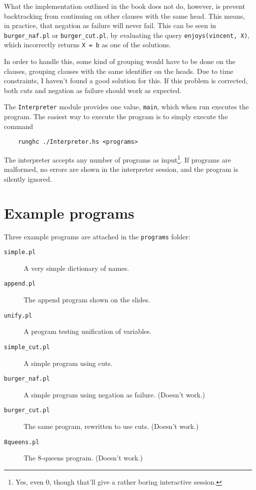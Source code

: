 \documentclass[11pt,a4paper]{article}
\begin{document}
What the implementation outlined in the book does not do, however, is prevent
backtracking from continuing on other clauses with the same head. This means,
in practice, that negation as failure will never fail. This can be seen in
\texttt{burger\_naf.pl} or \texttt{burger\_cut.pl}, by evaluating the query
\texttt{enjoys(vincent, X)}, which incorrectly returns \texttt{X = b} as one
of the solutions.

In order to handle this, some kind of grouping would have to be done on the
clauses, grouping clauses with the same identifier on the heads. Due to time
constraints, I haven't found a good solution for this. If this problem is
corrected, both cuts and negation as failure should work as expected.

The \texttt{Interpreter} module provides one value, \texttt{main}, which when
run executes the program. The easiest way to execute the program is to simply
execute the command

\begin{verbatim}
    runghc ./Interpreter.hs <programs>
\end{verbatim}

The interpreter accepts any number of programs as input\footnote{Yes, even 0,
though that'll give a rather boring interactive session.}. If programs are
malformed, no errors are shown in the interpreter session, and the program is
silently ignored.

\section{Example programs}
Three example programs are attached in the \texttt{programs} folder:

\begin{description}
    \item[\texttt{simple.pl}] A very simple dictionary of names.
    \item[\texttt{append.pl}] The append program shown on the slides.
    \item[\texttt{unify.pl}] A program testing unification of variables.
    \item[\texttt{simple\_cut.pl}] A simple program using cuts.
    \item[\texttt{burger\_naf.pl}] A simple program using negation as failure. (Doesn't work.)
    \item[\texttt{burger\_cut.pl}] The same program, rewritten to use cuts. (Doesn't work.)
    \item[\texttt{8queens.pl}] The 8-queens program. (Doesn't work.) 
\end{description}
\end{document}
